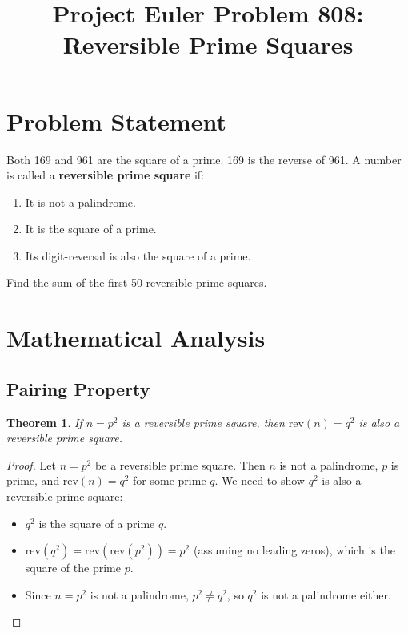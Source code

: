 \documentclass[12pt]{article}
\title{Project Euler Problem 808: Reversible Prime Squares}
\author{}
\date{}
\newtheorem{theorem}{Theorem}
\theoremstyle{definition}
\begin{document}
\maketitle

\section{Problem Statement}

Both 169 and 961 are the square of a prime. 169 is the reverse of 961. A number is called a \textbf{reversible prime square} if:
\begin{enumerate}
    \item It is not a palindrome.
    \item It is the square of a prime.
    \item Its digit-reversal is also the square of a prime.
\end{enumerate}

Find the sum of the first 50 reversible prime squares.

\section{Mathematical Analysis}

\subsection{Pairing Property}

\begin{theorem}
If $n = p^2$ is a reversible prime square, then $\mathrm{rev}(n) = q^2$ is also a reversible prime square.
\end{theorem}

\begin{proof}
Let $n = p^2$ be a reversible prime square. Then $n$ is not a palindrome, $p$ is prime, and $\mathrm{rev}(n) = q^2$ for some prime $q$. We need to show $q^2$ is also a reversible prime square:
\begin{itemize}
    \item $q^2$ is the square of a prime $q$. \checkmark
    \item $\mathrm{rev}(q^2) = \mathrm{rev}(\mathrm{rev}(p^2)) = p^2$ (assuming no leading zeros), which is the square of the prime $p$. \checkmark
    \item Since $n = p^2$ is not a palindrome, $p^2 \neq q^2$, so $q^2$ is not a palindrome either. \checkmark
\end{itemize}
\end{proof}
\end{document}
